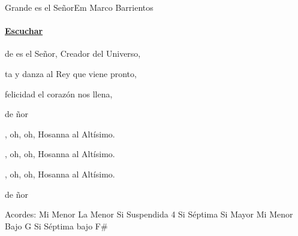 \documentclass[12pt, spanish]{book}
\begin{document}
    \begin{song}{Grande es el Señor}{Em}
    {} %
    {Marco Barrientos}
    {} %
    {}
        \ifChordBk
        \paragraph{\mbox{}\hfill\protect\href{https://open.spotify.com/intl-es/track/7uZ2Jy1jcKf1cZLxOrwZ6f}{Escuchar}\mbox{}\hfill}
        \fi

        \begin{SBOpGroup}
            de es el Señor, Creador del Universo,

            ta y danza al Rey que viene pronto,

             felicidad el corazón nos llena,

            de   ñor
        \end{SBOpGroup}

        \begin{SBChorus}
            , oh, oh, Hosanna al Altísimo.

            , oh, oh, Hosanna al Altísimo.

            , oh, oh, Hosanna al Altísimo.

            de   ñor
        \end{SBChorus}

        \ifChordBk
        \begin{SBOpGroup}
            Acordes:\break
            \upchord{\Em}\qquad Mi Menor \hfill
            \upchord{\Am}\qquad La Menor \hfill\null\break
            \upchord{\Bsus}\qquad Si Suspendida 4 \hfill
            \upchord{\Bseven}\qquad Si S\'eptima \hfill\null\break
            \upchord{\B}\qquad\qquad Si Mayor \hfill
            \upchord{\EmG}\qquad Mi Menor Bajo G \hfill\null\break
            \upchord{\BsevenFs}\qquad Si S\'eptima bajo F$\#$ \hfill\null\break
        \end{SBOpGroup}
        \fi
    \end{song}
\end{document}
